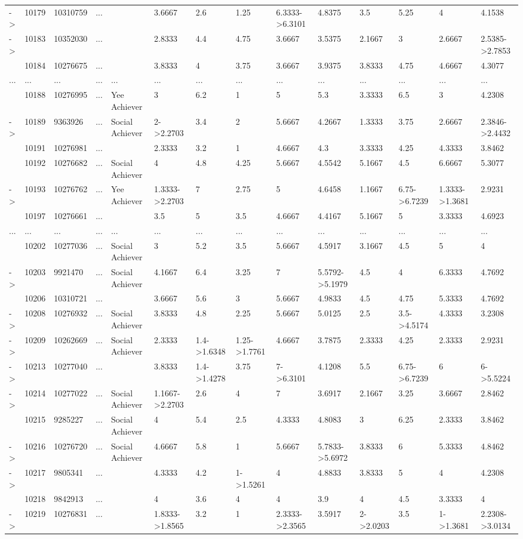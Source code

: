 \documentclass[6pt,a4paper]{article}
\begin{document}
\begin{landscape}
{\begin{longtable}{llllllllllllll}
-\textgreater &10179&10310759&...&&3.6667&2.6&1.25&6.3333-\textgreater 6.3101&4.8375&3.5&5.25&4&4.1538\tabularnewline
-\textgreater &10183&10352030&...&&2.8333&4.4&4.75&3.6667&3.5375&2.1667&3&2.6667&2.5385-\textgreater 2.7853\tabularnewline
&10184&10276675&...&&3.8333&4&3.75&3.6667&3.9375&3.8333&4.75&4.6667&4.3077\tabularnewline
...&...&...&...&...&...&...&...&...&...&...&...&...&...\tabularnewline
&10188&10276995&...&Yee Achiever&3&6.2&1&5&5.3&3.3333&6.5&3&4.2308\tabularnewline
-\textgreater &10189&9363926&...&Social Achiever&2-\textgreater 2.2703&3.4&2&5.6667&4.2667&1.3333&3.75&2.6667&2.3846-\textgreater 2.4432\tabularnewline
&10191&10276981&...&&2.3333&3.2&1&4.6667&4.3&3.3333&4.25&4.3333&3.8462\tabularnewline
&10192&10276682&...&Social Achiever&4&4.8&4.25&5.6667&4.5542&5.1667&4.5&6.6667&5.3077\tabularnewline
-\textgreater &10193&10276762&...&Yee Achiever&1.3333-\textgreater 2.2703&7&2.75&5&4.6458&1.1667&6.75-\textgreater 6.7239&1.3333-\textgreater 1.3681&2.9231\tabularnewline
&10197&10276661&...&&3.5&5&3.5&4.6667&4.4167&5.1667&5&3.3333&4.6923\tabularnewline
...&...&...&...&...&...&...&...&...&...&...&...&...&...\tabularnewline
&10202&10277036&...&Social Achiever&3&5.2&3.5&5.6667&4.5917&3.1667&4.5&5&4\tabularnewline
-\textgreater &10203&9921470&...&Social Achiever&4.1667&6.4&3.25&7&5.5792-\textgreater 5.1979&4.5&4&6.3333&4.7692\tabularnewline
&10206&10310721&...&&3.6667&5.6&3&5.6667&4.9833&4.5&4.75&5.3333&4.7692\tabularnewline
-\textgreater &10208&10276932&...&Social Achiever&3.8333&4.8&2.25&5.6667&5.0125&2.5&3.5-\textgreater 4.5174&4.3333&3.2308\tabularnewline
-\textgreater &10209&10262669&...&Social Achiever&2.3333&1.4-\textgreater 1.6348&1.25-\textgreater 1.7761&4.6667&3.7875&2.3333&4.25&2.3333&2.9231\tabularnewline
-\textgreater &10213&10277040&...&&3.8333&1.4-\textgreater 1.4278&3.75&7-\textgreater 6.3101&4.1208&5.5&6.75-\textgreater 6.7239&6&6-\textgreater 5.5224\tabularnewline
-\textgreater &10214&10277022&...&Social Achiever&1.1667-\textgreater 2.2703&2.6&4&7&3.6917&2.1667&3.25&3.6667&2.8462\tabularnewline
&10215&9285227&...&Social Achiever&4&5.4&2.5&4.3333&4.8083&3&6.25&2.3333&3.8462\tabularnewline
-\textgreater &10216&10276720&...&Social Achiever&4.6667&5.8&1&5.6667&5.7833-\textgreater 5.6972&3.8333&6&5.3333&4.8462\tabularnewline
-\textgreater &10217&9805341&...&&4.3333&4.2&1-\textgreater 1.5261&4&4.8833&3.8333&5&4&4.2308\tabularnewline
&10218&9842913&...&&4&3.6&4&4&3.9&4&4.5&3.3333&4\tabularnewline
-\textgreater &10219&10276831&...&&1.8333-\textgreater 1.8565&3.2&1&2.3333-\textgreater 2.3565&3.5917&2-\textgreater 2.0203&3.5&1-\textgreater 1.3681&2.2308-\textgreater 3.0134\tabularnewline

\end{longtable}}
\end{landscape}
\end{document}
